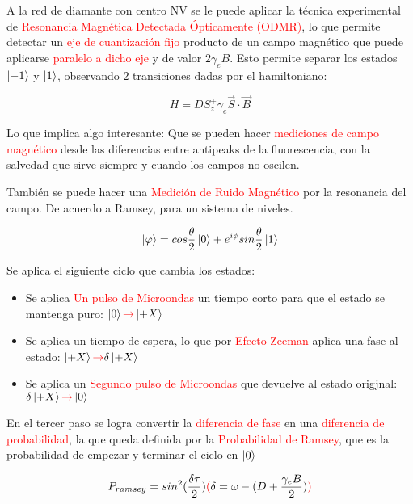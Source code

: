 \documentclass{book}
\begin{document}
A la red de diamante con centro NV se le puede aplicar la técnica experimental de \textcolor{red}{Resonancia Magnética Detectada Ópticamente (ODMR)}, lo que permite detectar un \textcolor{red}{eje de cuantización fijo} producto de un campo magnético que puede aplicarse \textcolor{red}{paralelo a dicho eje} y de valor $2\gamma_e B$. Esto permite separar los estados $\ket{-1}$ y $\ket{1}$, observando 2 transiciones dadas por el hamiltoniano:

\begin{equation}\label{eq8.1}H=DS_z^+\gamma_e \vec{S}\cdot\vec{B}\end{equation}

Lo que implica algo interesante: Que se pueden hacer \textcolor{red}{mediciones de campo magnético} desde las diferencias entre antipeaks de la fluorescencia, con la salvedad que sirve siempre y cuando los campos no oscilen.

También se puede hacer una \textcolor{red}{Medición de Ruido Magnético} por la  resonancia del campo. De acuerdo a Ramsey, para un sistema de niveles.

\begin{equation}\label{eq8.2}\ket{\varphi}=cos\frac{\theta}{2}\ket{0}+e^{i\phi}sin\frac{\theta}{2}\ket{1}\end{equation}

Se aplica el siguiente ciclo que cambia los estados:

\begin{itemize}
    \item Se aplica \textcolor{red}{Un pulso de Microondas} un tiempo corto para que el estado se mantenga puro: $\ket{0}\textcolor{red}{\rightarrow}\ket{+X}$ 
    \item Se aplica un tiempo de espera, lo que por \textcolor{red}{Efecto Zeeman} aplica una fase al estado: $\ket{+X}\textcolor{red}{\rightarrow}\delta\ket{+X}$ 
    \item Se aplica un \textcolor{red}{Segundo pulso de Microondas} que devuelve al estado origjnal: $\delta\ket{+X}\textcolor{red}{\rightarrow}\ket{0}$
\end{itemize}

En el tercer paso se logra convertir la \textcolor{red}{diferencia de fase} en una \textcolor{red}{diferencia de probabilidad}, la que queda definida por la \textcolor{red}{Probabilidad de Ramsey}, que es la probabilidad de empezar y terminar el ciclo en $\ket{0}$

\begin{equation}\label{eq8.3}P_{ramsey}=sin^2(\frac{\delta\tau}{2})\textcolor{red}{(}\delta=\omega-(D+\frac{\gamma_e B}{2})\textcolor{red}{)}\end{equation}
\end{document}
